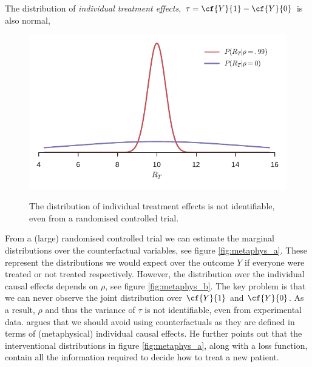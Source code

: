 The distribution of \emph{individual treatment effects}, $\tau = \cf{Y}{1} - \cf{Y}{0}$ is also normal,



\begin{figure}[h]
\captionsetup[subfigure]{position=b}
\centering
{}
\hspace{0.02\textwidth}
{\includegraphics[width=.45\linewidth]{figures/counterfactual_nonidentify_b.pdf}}
\caption{The distribution of individual treatment effects is not identifiable, even from a randomised controlled trial.}
\label{fig:metaphysical_distribution_difference}
\end{figure}

From a (large) randomised controlled trial we can estimate the marginal distributions over the counterfactual variables, see figure \ref{fig:metaphys_a}. These represent the distributions we would expect over the outcome $Y$ if everyone were treated or not treated respectively. However, the distribution over the individual causal effects depends on $\rho$, see figure \ref{fig:metaphys_b}. The key problem is that we can never observe the joint distribution over $\cf{Y}{1}$ and $\cf{Y}{0}$. As a result, $\rho$ and thus the variance of $\tau$ is not identifiable, even from experimental data. \citet{Dawid2000} argues that we should avoid using counterfactuals as they are defined in terms of (metaphysical) individual causal effects. He further points out that the interventional distributions in figure \ref{fig:metaphys_a}, along with a loss function, contain all the information required to decide how to treat a new patient.  

